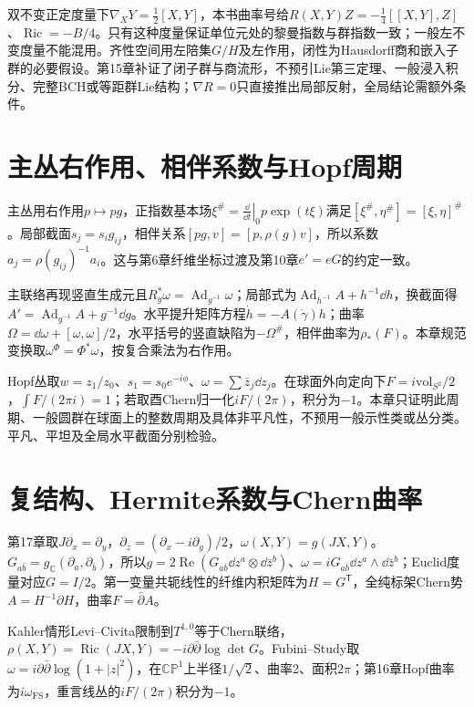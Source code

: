 双不变正定度量下$\nabla_XY=\frac12[X,Y]$，本书曲率号给$R(X,Y)Z=-\frac14[[X,Y],Z]$、$\operatorname{Ric}=-B/4$。只有这种度量保证单位元处的黎曼指数与群指数一致；一般左不变度量不能混用。齐性空间用左陪集$G/H$及左作用，闭性为Hausdorff商和嵌入子群的必要假设。第15章补证了闭子群与商流形，不预引Lie第三定理、一般浸入积分、完整BCH或等距群Lie结构；$\nabla R=0$只直接推出局部反射，全局结论需额外条件。


\section{主丛右作用、相伴系数与Hopf周期}
主丛用右作用$p\mapsto pg$，正指数基本场$\xi^\#=\left.\frac{\dd}{\dd t}\right|_0p\exp(t\xi)$满足$[\xi^\#,\eta^\#]=[\xi,\eta]^\#$。局部截面$s_j=s_i g_{ij}$，相伴关系$[pg,v]=[p,\rho(g)v]$，所以系数$a_j=\rho(g_{ij})^{-1}a_i$。这与第6章纤维坐标过渡及第10章$e'=eG$的约定一致。

主联络再现竖直生成元且$R_g^*\omega=\operatorname{Ad}_{g^{-1}}\omega$；局部式为$\operatorname{Ad}_{h^{-1}}A+h^{-1}\dd h$，换截面得$A'=\operatorname{Ad}_{g^{-1}}A+g^{-1}\dd g$。水平提升矩阵方程$\dot h=-A(\dot\gamma)h$；曲率$\Omega=\dd\omega+[\omega,\omega]/2$，水平括号的竖直缺陷为$-\Omega^\#$，相伴曲率为$\rho_*(F)$。本章规范变换取$\omega^\Phi=\Phi^*\omega$，按复合乘法为右作用。

Hopf丛取$w=z_1/z_0$、$s_1=s_0e^{-i\phi}$、$\omega=\sum\bar z_j\dd z_j$。在球面外向定向下$F=i\mathrm{vol}_{S^2}/2$，$\int F/(2\pi i)=1$；若取酉Chern归一化$iF/(2\pi)$，积分为$-1$。本章只证明此周期、一般圆群在球面上的整数周期及具体非平凡性，不预用一般示性类或丛分类。平凡、平坦及全局水平截面分别检验。

\section{复结构、Hermite系数与Chern曲率}
第17章取$J\partial_x=\partial_y$，$\partial_z=(\partial_x-i\partial_y)/2$，$\omega(X,Y)=g(JX,Y)$。$G_{a\bar b}=g_{\mathbb C}(\partial_a,\partial_{\bar b})$，所以$g=2\operatorname{Re}(G_{a\bar b}\dd z^a\otimes\dd\bar z^b)$、$\omega=iG_{a\bar b}\dd z^a\wedge\dd\bar z^b$；Euclid度量对应$G=I/2$。第一变量共轭线性的纤维内积矩阵为$H=G^{\mathsf T}$，全纯标架Chern势$A=H^{-1}\partial H$，曲率$F=\bar\partial A$。

Kahler情形Levi--Civita限制到$T^{1,0}$等于Chern联络，$\rho(X,Y)=\operatorname{Ric}(JX,Y)=-i\partial\bar\partial\log\det G$。Fubini--Study取$\omega=i\partial\bar\partial\log(1+|z|^2)$，在$\mathbb{CP}^1$上半径$1/\sqrt2$、曲率2、面积$2\pi$；第16章Hopf曲率为$i\omega_{\mathrm{FS}}$，重言线丛的$iF/(2\pi)$积分为$-1$。

